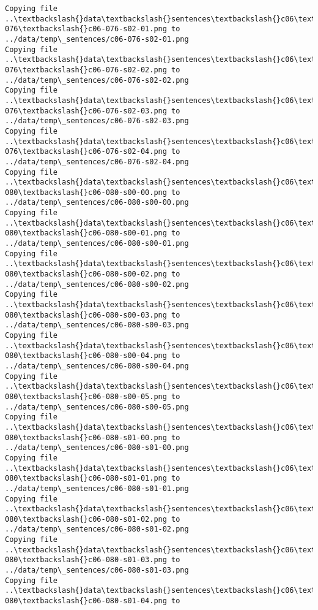 \documentclass[11pt]{article}
\begin{document}
\begin{Verbatim}[commandchars=\\\{\}]
Copying file ..\textbackslash{}data\textbackslash{}sentences\textbackslash{}c06\textbackslash{}c06-076\textbackslash{}c06-076-s02-01.png to
../data/temp\_sentences/c06-076-s02-01.png
Copying file ..\textbackslash{}data\textbackslash{}sentences\textbackslash{}c06\textbackslash{}c06-076\textbackslash{}c06-076-s02-02.png to
../data/temp\_sentences/c06-076-s02-02.png
Copying file ..\textbackslash{}data\textbackslash{}sentences\textbackslash{}c06\textbackslash{}c06-076\textbackslash{}c06-076-s02-03.png to
../data/temp\_sentences/c06-076-s02-03.png
Copying file ..\textbackslash{}data\textbackslash{}sentences\textbackslash{}c06\textbackslash{}c06-076\textbackslash{}c06-076-s02-04.png to
../data/temp\_sentences/c06-076-s02-04.png
Copying file ..\textbackslash{}data\textbackslash{}sentences\textbackslash{}c06\textbackslash{}c06-080\textbackslash{}c06-080-s00-00.png to
../data/temp\_sentences/c06-080-s00-00.png
Copying file ..\textbackslash{}data\textbackslash{}sentences\textbackslash{}c06\textbackslash{}c06-080\textbackslash{}c06-080-s00-01.png to
../data/temp\_sentences/c06-080-s00-01.png
Copying file ..\textbackslash{}data\textbackslash{}sentences\textbackslash{}c06\textbackslash{}c06-080\textbackslash{}c06-080-s00-02.png to
../data/temp\_sentences/c06-080-s00-02.png
Copying file ..\textbackslash{}data\textbackslash{}sentences\textbackslash{}c06\textbackslash{}c06-080\textbackslash{}c06-080-s00-03.png to
../data/temp\_sentences/c06-080-s00-03.png
Copying file ..\textbackslash{}data\textbackslash{}sentences\textbackslash{}c06\textbackslash{}c06-080\textbackslash{}c06-080-s00-04.png to
../data/temp\_sentences/c06-080-s00-04.png
Copying file ..\textbackslash{}data\textbackslash{}sentences\textbackslash{}c06\textbackslash{}c06-080\textbackslash{}c06-080-s00-05.png to
../data/temp\_sentences/c06-080-s00-05.png
Copying file ..\textbackslash{}data\textbackslash{}sentences\textbackslash{}c06\textbackslash{}c06-080\textbackslash{}c06-080-s01-00.png to
../data/temp\_sentences/c06-080-s01-00.png
Copying file ..\textbackslash{}data\textbackslash{}sentences\textbackslash{}c06\textbackslash{}c06-080\textbackslash{}c06-080-s01-01.png to
../data/temp\_sentences/c06-080-s01-01.png
Copying file ..\textbackslash{}data\textbackslash{}sentences\textbackslash{}c06\textbackslash{}c06-080\textbackslash{}c06-080-s01-02.png to
../data/temp\_sentences/c06-080-s01-02.png
Copying file ..\textbackslash{}data\textbackslash{}sentences\textbackslash{}c06\textbackslash{}c06-080\textbackslash{}c06-080-s01-03.png to
../data/temp\_sentences/c06-080-s01-03.png
Copying file ..\textbackslash{}data\textbackslash{}sentences\textbackslash{}c06\textbackslash{}c06-080\textbackslash{}c06-080-s01-04.png to

\end{Verbatim}
\end{document}
